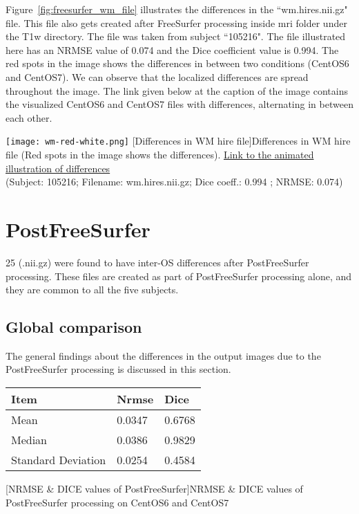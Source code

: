Figure~\ref{fig:freesurfer_wm_file} illustrates the differences in the ``wm.hires.nii.gz" file. This file also gets created after FreeSurfer processing inside mri folder under the T1w directory. The file was taken from subject ``105216". The file illustrated here has an NRMSE value of 0.074 and the Dice coefficient value is 0.994. The red spots in the image shows the differences in between two conditions (CentOS6 and CentOS7). We can observe that the localized differences are spread throughout the image. The link given below at the caption of the image contains the visualized CentOS6 and CentOS7 files with differences, alternating in between each other.

\begin{center}
\texttt{[image: wm-red-white.png]}
[Differences in WM hire file]{Differences in WM hire file (Red spots in the image shows the differences). \href{https://drive.google.com/file/d/1i6WpH6Le5xry4j-RtRZxt0_NP3Ulm5AT/view?usp=sharing}{Link to the animated illustration of differences}\\(Subject: 105216; Filename: wm.hires.nii.gz; Dice coeff.: 0.994 ; NRMSE: 0.074)}
\label{fig:freesurfer_wm_file}
\end{center}

\section{PostFreeSurfer}\label{sec:Postfreesurfer}
25 (.nii.gz) were found to have inter-OS differences after PostFreeSurfer processing. These files are created as part of PostFreeSurfer processing alone, and they are common to all the five subjects.

\subsection{Global comparison}
The general findings about the differences in the output images due to the PostFreeSurfer processing is discussed in this section.

\begin{center}
\begin{tabular}{|l|l|l|}
\hline
\textbf{Item}      & \textbf{Nrmse} & \textbf{Dice} \\ \hline
Mean               & 0.0347     & 0.6768   \\ \hline
Median             & 0.0386    & 0.9829   \\ \hline
Standard Deviation & 0.0254    & 0.4584   \\ \hline
\end{tabular}
  [NRMSE \& DICE values of PostFreeSurfer]{NRMSE \& DICE values of PostFreeSurfer processing on CentOS6 and CentOS7}
\label{tab:PostFreeSurfer_Metic_Values}
\end{center}

